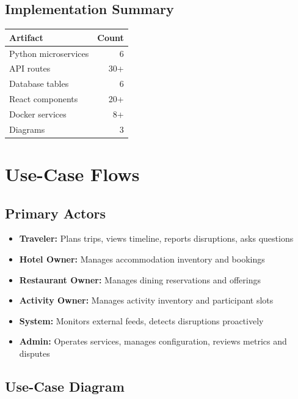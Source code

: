 \documentclass[11pt]{article}
\begin{document}
\subsection{Implementation Summary}

\begin{table}[H]\centering\small
\begin{tabular}{|l|r|}
\hline
\textbf{Artifact} & \textbf{Count} \\
\hline
Python microservices & 6 \\
API routes & 30+ \\
Database tables & 6 \\
React components & 20+ \\
Docker services & 8+ \\
Diagrams & 3 \\
\hline
\end{tabular}
\end{table}

\section{Use-Case Flows}

\subsection{Primary Actors}

\begin{itemize}
    \item \textbf{Traveler:} Plans trips, views timeline, reports disruptions, asks questions
    \item \textbf{Hotel Owner:} Manages accommodation inventory and bookings
    \item \textbf{Restaurant Owner:} Manages dining reservations and offerings
    \item \textbf{Activity Owner:} Manages activity inventory and participant slots
    \item \textbf{System:} Monitors external feeds, detects disruptions proactively
    \item \textbf{Admin:} Operates services, manages configuration, reviews metrics and disputes
\end{itemize}

\subsection{Use-Case Diagram}
\end{document}
